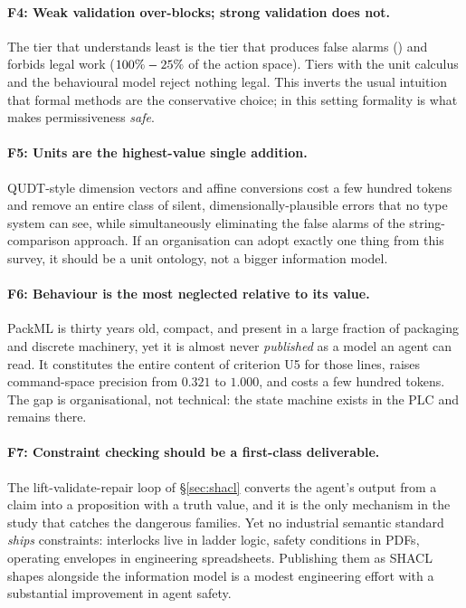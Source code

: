 \paragraph{F4: Weak validation over-blocks; strong validation does not.}
The tier that understands least is the tier that produces false alarms
(\FPRGTwo{}) and forbids legal work ($100\%-25\%{}$ of the action space).
Tiers with the unit calculus and the behavioural model reject nothing legal. This
inverts the usual intuition that formal methods are the conservative choice; in
this setting formality is what makes permissiveness \emph{safe}.

\paragraph{F5: Units are the highest-value single addition.} QUDT-style
dimension vectors and affine conversions cost a few hundred tokens and remove an
entire class of silent, dimensionally-plausible errors that no type system can
see, while simultaneously eliminating the false alarms of the string-comparison
approach. If an organisation can adopt exactly one thing from this survey, it
should be a unit ontology, not a bigger information model.

\paragraph{F6: Behaviour is the most neglected relative to its value.}
PackML is thirty years old, compact, and present in a large fraction of packaging
and discrete machinery, yet it is almost never \emph{published} as a model an
agent can read. It constitutes the entire content of criterion U5 for those lines,
raises command-space precision from $0.321$ to $1.000$, and costs a few hundred
tokens. The gap is organisational, not technical: the state machine exists in the
PLC and remains there.

\paragraph{F7: Constraint checking should be a first-class deliverable.}
The lift-validate-repair loop of \S\ref{sec:shacl} converts the agent's output
from a claim into a proposition with a truth value, and it is the only mechanism
in the study that catches the dangerous families. Yet no industrial semantic
standard \emph{ships} constraints: interlocks live in ladder logic, safety
conditions in PDFs, operating envelopes in engineering spreadsheets. Publishing
them as SHACL shapes alongside the information model is a modest engineering
effort with a substantial improvement in agent safety.

